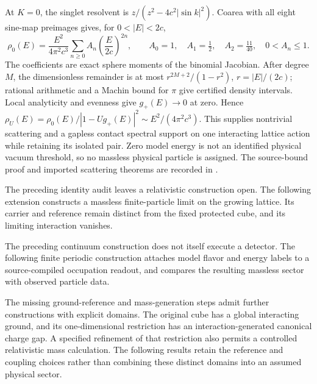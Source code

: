 At $K=0$, the singlet resolvent is
$z/(z^2-4c^2|\sin k|^2)$. Coarea with all eight sine-map preimages gives,
for $0<|E|<2c$,
\[
 \rho_0(E)=\frac{E^2}{4\pi^2c^3}
 \sum_{n\ge0}A_n\left(\frac{E}{2c}\right)^{2n},
 \qquad A_0=1,\quad A_1=\tfrac12,\quad A_2=\tfrac{11}{40},
 \quad 0<A_n\le1.
\]
The coefficients are exact sphere moments of the binomial Jacobian.
After degree $M$, the dimensionless remainder is at most
$r^{2M+2}/(1-r^2)$, $r=|E|/(2c)$; rational arithmetic and a Machin bound
for $\pi$ give certified density intervals. Local analyticity and evenness
give $g_+(E)\to0$ at zero. Hence
$\rho_U(E)=\rho_0(E)/|1-Ug_+(E)|^2\sim E^2/(4\pi^2c^3)$.
This supplies nontrivial scattering and a gapless contact spectral support
on one interacting lattice action while retaining its isolated pair.
Zero model energy is not an identified physical vacuum threshold, so no
massless physical particle is assigned. The source-bound proof and imported
scattering theorems are recorded in
.

{}
{}

{}
{}

The preceding identity audit leaves a relativistic construction open.
The following extension constructs a massless finite-particle limit on the
growing lattice. Its carrier and reference remain distinct from the fixed
protected cube, and its limiting interaction vanishes.

{}
{}

The preceding continuum construction does not itself execute a detector.
The following finite periodic construction attaches model flavor and energy
labels to a source-compiled occupation readout, and compares the resulting
massless sector with observed particle data.

{}
{}

The missing ground-reference and mass-generation steps admit further
constructions with explicit domains. The original cube has a global
interacting ground, and its one-dimensional restriction has an
interaction-generated canonical charge gap. A specified refinement of
that restriction also permits a controlled relativistic mass calculation.
The following results retain the reference and coupling choices rather
than combining these distinct domains into an assumed physical sector.

